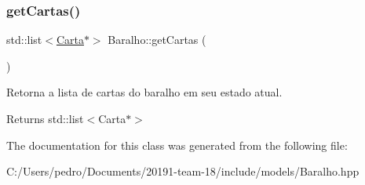 \subsubsection{\texorpdfstring{getCartas()}{getCartas()}}
{\footnotesize\ttfamily std\+::list$<$\mbox{\hyperlink{class_carta}{Carta}}$\ast$$>$ Baralho\+::get\+Cartas (\begin{DoxyParamCaption}{ }\end{DoxyParamCaption})}



Retorna a lista de cartas do baralho em seu estado atual. 

\begin{DoxyReturn}{Returns}
std\+::list$<$\+Carta$\ast$$>$ 
\end{DoxyReturn}


The documentation for this class was generated from the following file\+:\begin{DoxyCompactItemize}
\item 
C\+:/\+Users/pedro/\+Documents/20191-\/team-\/18/include/models/Baralho.\+hpp\end{DoxyCompactItemize}

